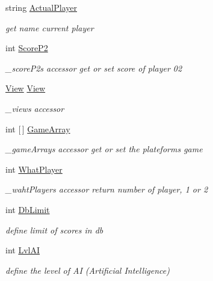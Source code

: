 \begin{DoxyCompactItemize}
string \hyperlink{class_morpion_1_1_model_adc7a7e85bab1d3a90418792a1e8078cf}{Actual\+Player}
\begin{DoxyCompactList}\small\item\em get name current player \end{DoxyCompactList}\item 
int \hyperlink{class_morpion_1_1_model_a5c9fac9656289625158e863d2b7850ff}{Score\+P2}
\begin{DoxyCompactList}\small\item\em \+\_\+score\+P2\textquotesingle{}s accessor get or set score of player 02 \end{DoxyCompactList}\item 
\hyperlink{class_morpion_1_1_view}{View} \hyperlink{class_morpion_1_1_model_a9e23eaa776d26da2b6ef98aa5fb8db88}{View}
\begin{DoxyCompactList}\small\item\em \+\_\+view\textquotesingle{}s accessor \end{DoxyCompactList}\item 
int \mbox{[}$\,$\mbox{]} \hyperlink{class_morpion_1_1_model_a565b0372c7f7833b244c03721f7eebd6}{Game\+Array}
\begin{DoxyCompactList}\small\item\em \+\_\+game\+Array\textquotesingle{}s accessor get or set the plateform\textquotesingle{}s game \end{DoxyCompactList}\item 
int \hyperlink{class_morpion_1_1_model_a56f84098c9bde669925d9a6850aaf061}{What\+Player}
\begin{DoxyCompactList}\small\item\em \+\_\+waht\+Player\textquotesingle{}s accessor return number of player, 1 or 2 \end{DoxyCompactList}\item 
int \hyperlink{class_morpion_1_1_model_a9a111fd09fe1b8cfd2beada02951f6fa}{Db\+Limit}
\begin{DoxyCompactList}\small\item\em define limit of scores in db \end{DoxyCompactList}\item 
int \hyperlink{class_morpion_1_1_model_a99d714c546cbe2f67a4cdb04c0c32f1f}{Lvl\+AI}
\begin{DoxyCompactList}\small\item\em define the level of AI (Artificial Intelligence) \end{DoxyCompactList}\end{DoxyCompactItemize}


